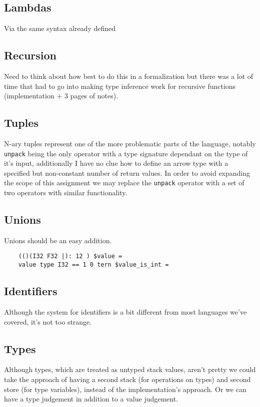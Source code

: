 \documentclass{article}
\begin{document}
\subsection{Lambdas}
Via the same syntax already defined

\subsection{Recursion}
Need to think about how best to do this in a formalization but there was a lot of time that had to go into making type inference work for recursive functions (implementation + 3 pages of notes).

\subsection{Tuples}
N-ary tuples represent one of the more problematic parts of the language, notably \texttt{unpack} being the only operator with a type signature dependant on the type of it's input, additionally I have no clue how to define an arrow type with a specified but non-constant number of return values. In order to avoid expanding the scope of this assignment we may replace the \texttt{unpack} operator with a set of two operators with similar functionality.

\subsection{Unions}
Unions should be an easy addition.

\begin{verbatim}
    (()(I32 F32 |): 12 ) $value =
    value type I32 == 1 0 tern $value_is_int =
\end{verbatim}

\subsection{Identifiers}
Although the system for identifiers is a bit different from most languages we've covered, it's not too strange.

\subsection{Types}
Although types, which are treated as untyped stack values, aren't pretty we could take the approach of having a second stack (for operations on types) and second store (for type variables), instead of the implementation's approach. Or we can have a type judgement in addition to a value judgement. 
\end{document}
